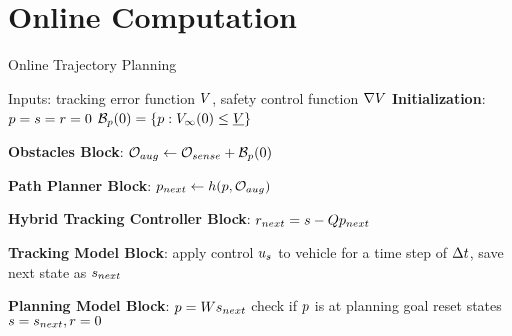 \section{Online Computation \label{sec:online}}
\begin{algorithm}[bp]
	
	\caption{Online Trajectory Planning}
	\label{alg:algOnline}
	\begin{algorithmic}[1]
		\STATE Inputs: tracking error function $V$, safety control function $\nabla V$
		\STATE \textbf{Initialization}: \label{ln:Istart}
		\STATE $p = s = r = 0$
		\STATE $\mathcal B_p(0) = \{p: V_\infty(0) \le \underline{V}\}$ \label{ln:Iend}
		
		\STATE \textbf{Obstacles Block}: \label{ln:obsStart}
		\STATE $\mathcal{O}_{aug} \leftarrow \mathcal{O}_{sense} + \mathcal B_p(0)$ \label{ln:obsEnd}
		
		\STATE \textbf{Path Planner Block}:\label{ln:plannerStart}
		\STATE $p_{next} \leftarrow h(p, \mathcal{O}_{aug})$\label{ln:plannerEnd}
		
		\STATE \textbf{Hybrid Tracking Controller Block}:\label{ln:controllerStart}
		\STATE $r_{next} = s - Qp_{next}$
		
		\ELSE {} \ENDIF \label{ln:controllerEnd}
		
		\STATE \textbf{Tracking Model Block}: \label{ln:trackingStart}
		\STATE apply control $u_s$ to vehicle for a time step of $\Delta t$, save next state as $s_{next}$ \label{ln:trackingEnd}
		
		\STATE \textbf{Planning Model Block}:\label{ln:planningStart}
		\STATE $p = Ws_{next}$
		\STATE check if $p$ is at planning goal
		\STATE reset states $s = s_{next}, r = 0$ \label{ln:planningEnd}
		\ENDWHILE
	\end{algorithmic}
\end{algorithm}



